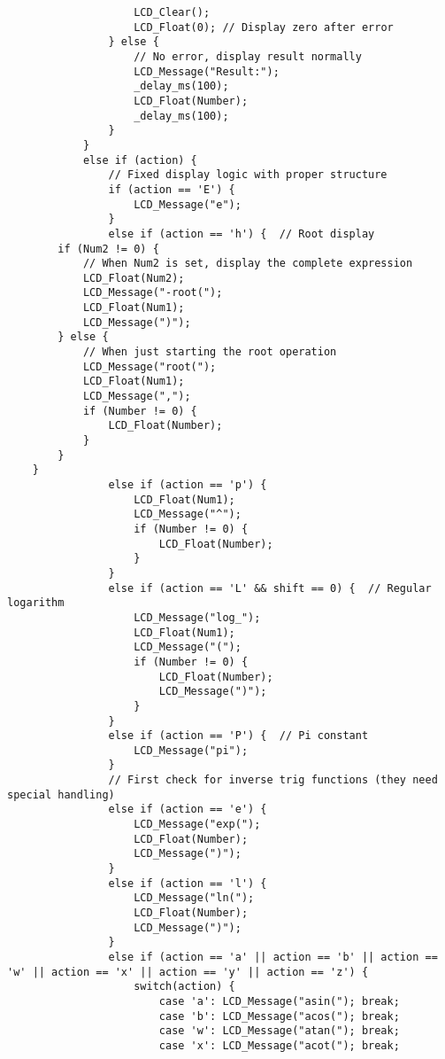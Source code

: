 \documentclass{article}
\begin{document}
\begin{verbatim}
                    LCD_Clear();
                    LCD_Float(0); // Display zero after error
                } else {
                    // No error, display result normally
                    LCD_Message("Result:");
                    _delay_ms(100);
                    LCD_Float(Number);
                    _delay_ms(100);
                }
            }
            else if (action) {
                // Fixed display logic with proper structure
                if (action == 'E') {
                    LCD_Message("e");
                }
                else if (action == 'h') {  // Root display
        if (Num2 != 0) {
            // When Num2 is set, display the complete expression
            LCD_Float(Num2);
            LCD_Message("-root(");
            LCD_Float(Num1);
            LCD_Message(")");
        } else {
            // When just starting the root operation
            LCD_Message("root(");
            LCD_Float(Num1);
            LCD_Message(",");
            if (Number != 0) {
                LCD_Float(Number);
            }
        }
    }
                else if (action == 'p') {
                    LCD_Float(Num1);
                    LCD_Message("^");
                    if (Number != 0) {
                        LCD_Float(Number);
                    }
                }
                else if (action == 'L' && shift == 0) {  // Regular logarithm
                    LCD_Message("log_");
                    LCD_Float(Num1);
                    LCD_Message("(");
                    if (Number != 0) {
                        LCD_Float(Number);
                        LCD_Message(")");
                    }
                }
                else if (action == 'P') {  // Pi constant
                    LCD_Message("pi");
                }
                // First check for inverse trig functions (they need special handling)
                else if (action == 'e') {
                    LCD_Message("exp(");
                    LCD_Float(Number);
                    LCD_Message(")");
                }
                else if (action == 'l') {
                    LCD_Message("ln(");
                    LCD_Float(Number);
                    LCD_Message(")");
                }
                else if (action == 'a' || action == 'b' || action == 'w' || action == 'x' || action == 'y' || action == 'z') {
                    switch(action) {
                        case 'a': LCD_Message("asin("); break;
                        case 'b': LCD_Message("acos("); break;
                        case 'w': LCD_Message("atan("); break;
                        case 'x': LCD_Message("acot("); break;

\end{verbatim}
\end{document}
